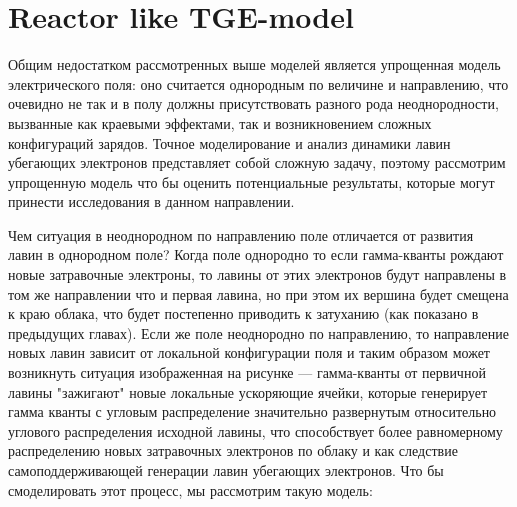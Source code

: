 \section{Reactor like TGE-model}\label{sec:thunderstorm/reactor}

Общим недостатком рассмотренных выше моделей является упрощенная модель электрического поля: оно считается однородным по величине и направлению, что очевидно не так и в полу должны присутствовать разного рода неоднородности, вызванные как краевыми эффектами, так и возникновением сложных конфигураций зарядов. Точное моделирование и анализ динамики лавин убегающих электронов представляет собой сложную задачу, поэтому рассмотрим упрощенную модель что бы оценить потенциальные результаты, которые могут принести исследования в данном направлении. 

Чем ситуация в неоднородном по направлению поле отличается от развития лавин в однородном поле? Когда поле однородно то если гамма-кванты рождают новые затравочные электроны, то лавины от этих электронов будут направлены в том же направлении что и  первая лавина, но при этом их вершина будет смещена к  краю облака, что будет постепенно приводить к затуханию (как показано в предыдущих главах). Если же поле неоднородно по направлению, то направление новых лавин зависит от локальной конфигурации поля и таким образом может возникнуть ситуация изображенная на рисунке --- гамма-кванты от первичной лавины "зажигают" новые локальные ускоряющие ячейки, которые генерирует гамма кванты с угловым распределение значительно развернутым относительно углового распределения исходной лавины, что способствует более равномерному распределению новых затравочных электронов по облаку и как следствие  самоподдерживающей генерации лавин убегающих электронов.
Что бы смоделировать этот процесс, мы рассмотрим такую модель:
